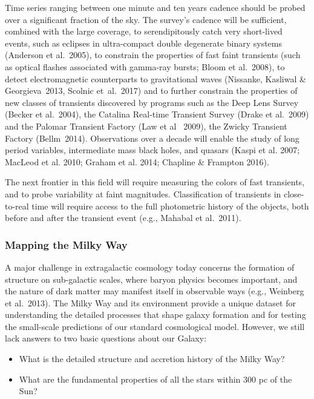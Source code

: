 Time series ranging between one minute and ten years cadence should be
probed over a significant fraction of the sky. The survey's cadence
will be sufficient, combined with the large coverage, to
serendipitously catch very short-lived events, such as eclipses in
ultra-compact double degenerate binary systems (Anderson et al.~2005),
to constrain the properties of fast faint transients (such as optical
flashes associated with gamma-ray bursts; Bloom et al.~2008), to
detect electromagnetic counterparts to gravitational waves (Nissanke,
Kasliwal \& Georgieva~2013, Scolnic et~al.~2017) and to further constrain the
properties of new classes of transients discovered by programs such as
the Deep Lens Survey (Becker et al.~2004), the Catalina Real-time
Transient Survey (Drake et al.~2009) and the Palomar Transient Factory
(Law et al~ 2009), the Zwicky Transient Factory (Bellm~2014). Observations
over a decade will enable the study of long period variables, intermediate mass
black holes, and quasars (Kaspi et al. 2007; MacLeod et al. 2010; Graham et al.
2014; Chapline \& Frampton 2016).


The next frontier
in this field will require measuring the colors of fast transients,
and to probe variability at faint magnitudes. Classification of transients in
close-to-real time will require access to the full photometric history
of the objects, both before and after the transient event (e.g.,
Mahabal et al.~2011).


\subsubsection{ Mapping the Milky Way}

A major challenge in extragalactic cosmology today concerns the formation of structure on sub-galactic scales, where
baryon physics becomes important, and the nature of dark matter may manifest itself in observable ways (e.g., Weinberg
et al.~2013). The Milky Way and its environment provide a unique dataset for understanding the detailed processes that
shape galaxy formation and for testing the small-scale predictions of
our standard cosmological model. However, we still lack
answers to two basic questions about our Galaxy:
\begin{itemize}
\item What is the detailed structure and accretion history of the Milky Way?
\item What are the fundamental properties of all the stars within 300 pc of the Sun?
\end{itemize}

